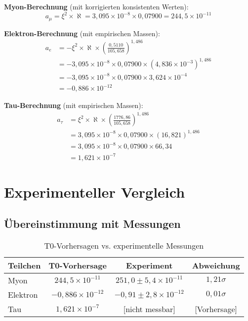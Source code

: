 \documentclass[12pt,a4paper]{article}
\newcommand{\xipar}{\xi}
\newcommand{\sigmadev}{\sigma}
\begin{document}
	\textbf{Myon-Berechnung} (mit korrigierten konsistenten Werten):
	\begin{equation}
		a_\mu = \xipar^2 \times \aleph = 3{,}095 \times 10^{-8} \times 0{,}07900 = 244{,}5 \times 10^{-11}
	\end{equation}
	
	\textbf{Elektron-Berechnung} (mit empirischen Massen):
	\begin{align}
		a_e &= -\xipar^2 \times \aleph \times \left(\frac{0{,}5110}{105{,}658}\right)^{1{,}486} \\
		&= -3{,}095 \times 10^{-8} \times 0{,}07900 \times (4{,}836 \times 10^{-3})^{1{,}486} \\
		&= -3{,}095 \times 10^{-8} \times 0{,}07900 \times 3{,}624 \times 10^{-4} \\
		&= -0{,}886 \times 10^{-12}
	\end{align}
	
	\textbf{Tau-Berechnung} (mit empirischen Massen):
	\begin{align}
		a_\tau &= \xipar^2 \times \aleph \times \left(\frac{1776{,}86}{105{,}658}\right)^{1{,}486} \\
		&= 3{,}095 \times 10^{-8} \times 0{,}07900 \times (16{,}821)^{1{,}486} \\
		&= 3{,}095 \times 10^{-8} \times 0{,}07900 \times 66{,}34 \\
		&= 1{,}621 \times 10^{-7}
	\end{align}
	
	\section{Experimenteller Vergleich}
	
	\subsection{\"Ubereinstimmung mit Messungen}
	
	\begin{table}[H]
		\centering
		\begin{tabular}{lccc}
			\toprule
			\textbf{Teilchen} & \textbf{T0-Vorhersage} & \textbf{Experiment} & \textbf{Abweichung} \\
			\midrule
			Myon & $244{,}5 \times 10^{-11}$ & $251{,}0 \pm 5{,}4 \times 10^{-11}$ & $1{,}21\sigmadev$ \\
			Elektron & $-0{,}886 \times 10^{-12}$ & $-0{,}91 \pm 2{,}8 \times 10^{-12}$ & $0{,}01\sigmadev$ \\
			Tau & $1{,}621 \times 10^{-7}$ & [nicht messbar] & [Vorhersage] \\
			\bottomrule
		\end{tabular}
		\caption{T0-Vorhersagen vs. experimentelle Messungen}
	\end{table}
	
\end{document}
